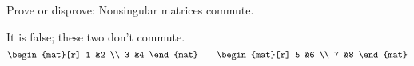 
\begin{Exercise}[
name={},
title={}, 
difficulty=0,
origin={\cite{JH}}]
Prove or disprove: Nonsingular matrices commute.
\end{Exercise}

\begin{Answer}
      It is false; these two don't commute.
      \begin{equation*}
         \begin{mat}[r]
           1  &2  \\
           3  &4
         \end{mat}
         \qquad
         \begin{mat}[r]
           5  &6  \\
           7  &8
         \end{mat}
      \end{equation*}  
\end{Answer}
